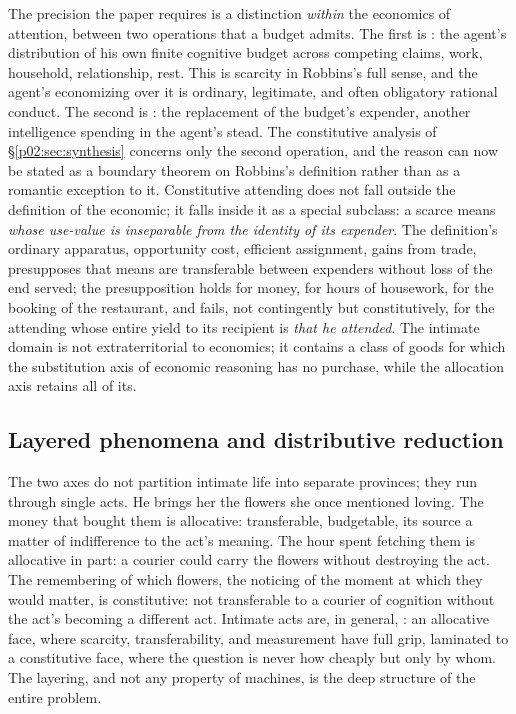 The precision the paper requires is a distinction \emph{within} the economics of attention, between two operations that a budget admits. The first is : the agent's distribution of his own finite cognitive budget across competing claims, work, household, relationship, rest. This is scarcity in Robbins's full sense, and the agent's economizing over it is ordinary, legitimate, and often obligatory rational conduct. The second is : the replacement of the budget's expender, another intelligence spending in the agent's stead. The constitutive analysis of \S\ref{p02:sec:synthesis} concerns only the second operation, and the reason can now be stated as a boundary theorem on Robbins's definition rather than as a romantic exception to it. Constitutive attending does not fall outside the definition of the economic; it falls inside it as a special subclass: a scarce means \emph{whose use-value is inseparable from the identity of its expender}. The definition's ordinary apparatus, opportunity cost, efficient assignment, gains from trade, presupposes that means are transferable between expenders without loss of the end served; the presupposition holds for money, for hours of housework, for the booking of the restaurant, and fails, not contingently but constitutively, for the attending whose entire yield to its recipient is \emph{that he attended}. The intimate domain is not extraterritorial to economics; it contains a class of goods for which the substitution axis of economic reasoning has no purchase, while the allocation axis retains all of its.

\subsection{Layered phenomena and distributive reduction}
\label{p02:sec:pe-layered}

The two axes do not partition intimate life into separate provinces; they run through single acts. He brings her the flowers she once mentioned loving. The money that bought them is allocative: transferable, budgetable, its source a matter of indifference to the act's meaning. The hour spent fetching them is allocative in part: a courier could carry the flowers without destroying the act. The remembering of which flowers, the noticing of the moment at which they would matter, is constitutive: not transferable to a courier of cognition without the act's becoming a different act. Intimate acts are, in general, : an allocative face, where scarcity, transferability, and measurement have full grip, laminated to a constitutive face, where the question is never how cheaply but only by whom. The layering, and not any property of machines, is the deep structure of the entire problem.

